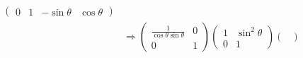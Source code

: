 ﻿\documentclass{book} \usepackage{exsheets} \usepackage{xeCJK}
\begin{document}
\begin{solution}
\begin{align*}
\begin{pmatrix}
                                                                                                                                                                                  0&1&-\sin\theta&\cos\theta
                                                                                                                                                                                \end{pmatrix}\\&\Rightarrow
                                                                                                                                                                                                 \begin{pmatrix}
                                                                                                                                                                                                   \frac{1}{\cos\theta\sin\theta}&0\\
                                                                                                                                                                                                   0&1
                                                                                                                                                                                                 \end{pmatrix}
                                                                                                                                                                                                      \begin{pmatrix}
                                                                                                                                                                                                        1&\sin^2\theta\\
                                                                                                                                                                                                        0&1
                                                                                                                                                                                                      \end{pmatrix}
                                                                                                                                                                                                           \begin{pmatrix}

\end{pmatrix}
\end{align*}
\end{solution}
\end{document}
